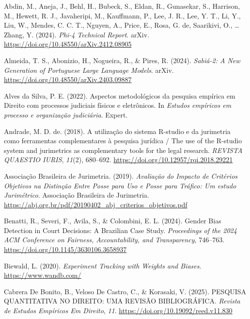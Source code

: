 \documentclass[
  12pt,
]{article}
\newlength{\cslhangindent}
\newenvironment{CSLReferences}[2] %
 {\begin{list}{}{%
  \setlength{\itemindent}{0pt}
  \setlength{\leftmargin}{0pt}
  \setlength{\parsep}{0pt}
  \ifodd #1
   \setlength{\leftmargin}{\cslhangindent}
   \setlength{\itemindent}{-1\cslhangindent}
  \fi
  \setlength{\itemsep}{#2\baselineskip}}}
 {\end{list}}
\begin{document}
\label{refs}
\begin{CSLReferences}{1}{0}
Abdin, M., Aneja, J., Behl, H., Bubeck, S., Eldan, R., Gunasekar, S.,
Harrison, M., Hewett, R. J., Javaheripi, M., Kauffmann, P., Lee, J. R.,
Lee, Y. T., Li, Y., Liu, W., Mendes, C. C. T., Nguyen, A., Price, E.,
Rosa, G. de, Saarikivi, O., \ldots{} Zhang, Y. (2024). \emph{Phi-4
{Technical} {Report}}. arXiv.
\url{https://doi.org/10.48550/arXiv.2412.08905}

Almeida, T. S., Abonizio, H., Nogueira, R., \& Pires, R. (2024).
\emph{Sabiá-2: {A} {New} {Generation} of {Portuguese} {Large} {Language}
{Models}}. arXiv. \url{https://doi.org/10.48550/arXiv.2403.09887}

Alves da Silva, P. E. (2022). Aspectos metodológicos da pesquisa
empírica em {Direito} com processos judiciais físicos e eletrônicos. In
\emph{Estudos empíricos em processo e organização judiciária}. Expert.

Andrade, M. D. de. (2018). A utilização do sistema {R}-studio e da
jurimetria como ferramentas complementares à pesquisa jurídica / {The}
use of the {R}-studio system and jurimetrics as complementary tools for
the legal research. \emph{REVISTA QUAESTIO IURIS}, \emph{11}(2),
680--692. \url{https://doi.org/10.12957/rqi.2018.29221}

Associação Brasileira de Jurimetria. (2019). \emph{Avaliação do
{Impacto} de {Critérios} {Objetivos} na {Distinção} {Entre} {Posse} para
{Uso} e {Posse} para {Tráfico}: {Um} estudo {Jurimétrico}}. Associação
Brasileira de Jurimetria.
\url{https://abj.org.br/pdf/20190402_abj_criterios_objetivos.pdf}

Benatti, R., Severi, F., Avila, S., \& Colombini, E. L. (2024). Gender
{Bias} {Detection} in {Court} {Decisions}: {A} {Brazilian} {Case}
{Study}. \emph{Proceedings of the 2024 {ACM} {Conference} on {Fairness},
{Accountability}, and {Transparency}}, 746--763.
\url{https://doi.org/10.1145/3630106.3658937}

Biewald, L. (2020). \emph{Experiment {Tracking} with {Weights} and
{Biases}}. \url{https://www.wandb.com/}

Cabrera De Bonito, B., Veloso De Castro, C., \& Korasaki, V. (2025).
{PESQUISA} {QUANTITATIVA} {NO} {DIREITO}: {UMA} {REVISÃO}
{BIBLIOGRÁFICA}. \emph{Revista de Estudos Empíricos Em Direito},
\emph{11}. \url{https://doi.org/10.19092/reed.v11.830}


\end{CSLReferences}
\end{document}
